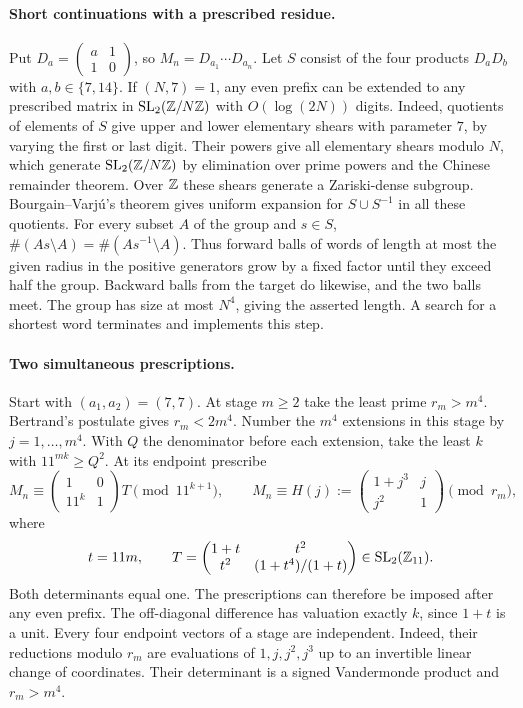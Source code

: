 \documentclass[11pt,a4paper]{article}
\begin{document}
\paragraph{Short continuations with a prescribed residue.}
Put \(D_a=\left(\begin{smallmatrix}a&1\\1&0\end{smallmatrix}\right)\), so \(M_n=D_{a_1}\cdots D_{a_n}\). Let \(S\) consist of the four products \(D_aD_b\) with \(a,b\in\{7,14\}\). If \((N,7)=1\), any even prefix can be extended to any prescribed matrix in \(\mathrm{SL}_2(\mathbb Z/N\mathbb Z)\) with \(O(\log(2N))\) digits.
Indeed, quotients of elements of \(S\) give upper and lower elementary shears with parameter \(7\), by varying the first or last digit. Their powers give all elementary shears modulo \(N\), which generate \(\mathrm{SL}_2(\mathbb Z/N\mathbb Z)\) by elimination over prime powers and the Chinese remainder theorem. Over \(\mathbb Z\) these shears generate a Zariski-dense subgroup. Bourgain--Varj\'u's theorem \cite[Thm.~1]{bv} gives uniform expansion for \(S\cup S^{-1}\) in all these quotients. For every subset \(A\) of the group and \(s\in S\),
\(\#(As\setminus A)=\#(As^{-1}\setminus A)\).
Thus forward balls of words of length at most the given radius in the positive generators grow by a fixed factor until they exceed half the group. Backward balls from the target do likewise, and the two balls meet. The group has size at most \(N^4\), giving the asserted length. A search for a shortest word terminates and implements this step.

\paragraph{Two simultaneous prescriptions.}
Start with \((a_1,a_2)=(7,7)\). At stage \(m\ge2\) take the least prime \(r_m>m^4\). Bertrand's postulate gives \(r_m<2m^4\). Number the \(m^4\) extensions in this stage by \(j=1,\ldots,m^4\). With \(Q\) the denominator before each extension, take the least \(k\) with \(11^{mk}\ge Q^2\). At its endpoint prescribe
\[
 M_n\equiv
 \begin{pmatrix}1&0\\11^k&1\end{pmatrix}T
 \pmod {11^{k+1}},\qquad
 M_n\equiv H(j):=
 \begin{pmatrix}1+j^3&j\\j^2&1\end{pmatrix}\pmod {r_m},
\]
where
\[
 t=11m,\qquad
 T=\begin{pmatrix}1+t&t^2\\ t^2&(1+t^4)/(1+t)\end{pmatrix}\in\mathrm{SL}_2(\mathbb Z_{11}).
\]
Both determinants equal one. The prescriptions can therefore be imposed after any even prefix. The off-diagonal difference has valuation exactly \(k\), since \(1+t\) is a unit. Every four endpoint vectors of a stage are independent. Indeed, their reductions modulo \(r_m\) are evaluations of \(1,j,j^2,j^3\) up to an invertible linear change of coordinates. Their determinant is a signed Vandermonde product and \(r_m>m^4\).
\end{document}
